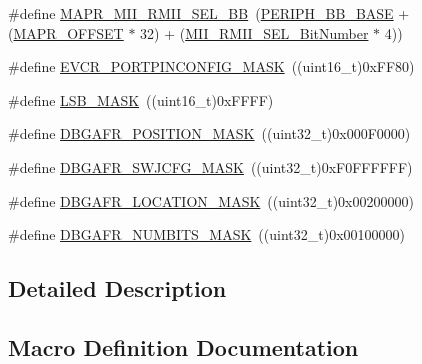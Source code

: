 \begin{DoxyCompactItemize}
\item 
\#define \mbox{\hyperlink{group___g_p_i_o___private___defines_ga00e75433e8a45d7a55c021397cb85aa9}{M\+A\+P\+R\+\_\+\+M\+I\+I\+\_\+\+R\+M\+I\+I\+\_\+\+S\+E\+L\+\_\+\+BB}}~(\mbox{\hyperlink{group___peripheral__memory__map_gaed7efc100877000845c236ccdc9e144a}{P\+E\+R\+I\+P\+H\+\_\+\+B\+B\+\_\+\+B\+A\+SE}} + (\mbox{\hyperlink{group___g_p_i_o___private___defines_ga472f80f63d09e365d283675f3466c8a1}{M\+A\+P\+R\+\_\+\+O\+F\+F\+S\+ET}} $\ast$ 32) + (\mbox{\hyperlink{group___g_p_i_o___private___defines_gad4a9bbd669109039291f942d923ff8ae}{M\+I\+I\+\_\+\+R\+M\+I\+I\+\_\+\+S\+E\+L\+\_\+\+Bit\+Number}} $\ast$ 4))
\item 
\#define \mbox{\hyperlink{group___g_p_i_o___private___defines_ga97d20e77a588a767e1a775dd4299d1c5}{E\+V\+C\+R\+\_\+\+P\+O\+R\+T\+P\+I\+N\+C\+O\+N\+F\+I\+G\+\_\+\+M\+A\+SK}}~((uint16\+\_\+t)0x\+F\+F80)
\item 
\#define \mbox{\hyperlink{group___g_p_i_o___private___defines_ga338d54179ac0da2af2363e3a930bf374}{L\+S\+B\+\_\+\+M\+A\+SK}}~((uint16\+\_\+t)0x\+F\+F\+F\+F)
\item 
\#define \mbox{\hyperlink{group___g_p_i_o___private___defines_gafa4eba58b1839413acb4591da00e7559}{D\+B\+G\+A\+F\+R\+\_\+\+P\+O\+S\+I\+T\+I\+O\+N\+\_\+\+M\+A\+SK}}~((uint32\+\_\+t)0x000\+F0000)
\item 
\#define \mbox{\hyperlink{group___g_p_i_o___private___defines_ga47a1cd3c0505a7be3e161671237d8460}{D\+B\+G\+A\+F\+R\+\_\+\+S\+W\+J\+C\+F\+G\+\_\+\+M\+A\+SK}}~((uint32\+\_\+t)0x\+F0\+F\+F\+F\+F\+F\+F)
\item 
\#define \mbox{\hyperlink{group___g_p_i_o___private___defines_gaab83406f875057e96458940ca9519b7d}{D\+B\+G\+A\+F\+R\+\_\+\+L\+O\+C\+A\+T\+I\+O\+N\+\_\+\+M\+A\+SK}}~((uint32\+\_\+t)0x00200000)
\item 
\#define \mbox{\hyperlink{group___g_p_i_o___private___defines_gaea2fa480dea4d6e061eaa1417a9196dc}{D\+B\+G\+A\+F\+R\+\_\+\+N\+U\+M\+B\+I\+T\+S\+\_\+\+M\+A\+SK}}~((uint32\+\_\+t)0x00100000)
\end{DoxyCompactItemize}


\subsection{Detailed Description}


\subsection{Macro Definition Documentation}
\mbox{\label{group___g_p_i_o___private___defines_ga0ecdd0dd5180e1ee385c22f66a2cd660}} 
